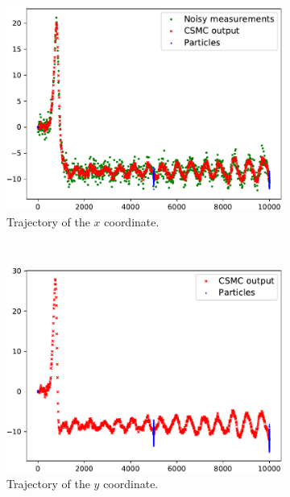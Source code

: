 \documentclass[english, DIV=13]{scrartcl}
\begin{document}
\begin{figure}[h]
    \centering
    \begin{subfigure}{0.49\textwidth}
        \includegraphics[width=\textwidth]{figures/x-trajectory-data}
        \caption{Trajectory of the $x$ coordinate.} 
        \label{fig:x-trajectory-data}
    \end{subfigure}%
    ~
    \begin{subfigure}{0.49\textwidth}
        \includegraphics[width=\textwidth]{figures/y-trajectory-data}
        \caption{Trajectory of the $y$ coordinate.} 
        \label{fig:y-trajectory-data}
    \end{subfigure}\\
    \begin{subfigure}{0.49\textwidth}

\end{subfigure}
\end{figure}
\end{document}
